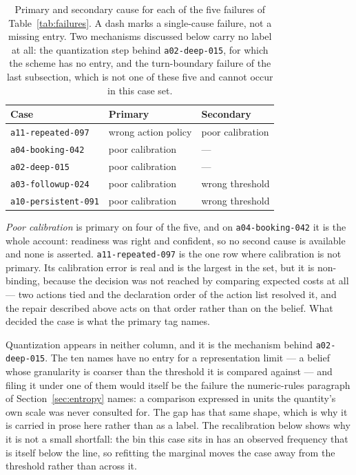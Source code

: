 \documentclass{article}
\begin{document}
\begin{table}[t]
\centering
\small
\begin{tabular}{lll}
\toprule
Case & Primary & Secondary \\
\midrule
\texttt{a11-repeated-097}   & wrong action policy & poor calibration \\
\texttt{a04-booking-042}    & poor calibration    & --- \\
\texttt{a02-deep-015}       & poor calibration    & --- \\
\texttt{a03-followup-024}   & poor calibration    & wrong threshold \\
\texttt{a10-persistent-091} & poor calibration    & wrong threshold \\
\bottomrule
\end{tabular}
\caption{Primary and secondary cause for each of the five failures of
Table~\ref{tab:failures}. A dash marks a single-cause failure, not a missing entry.
Two mechanisms discussed below carry no label at all: the quantization step behind
\texttt{a02-deep-015}, for which the scheme has no entry, and the turn-boundary
failure of the last subsection, which is not one of these five and cannot occur in
this case set.}
\label{tab:categories}
\end{table}

\emph{Poor calibration} is primary on four of the five, and on
\texttt{a04-booking-042} it is the whole account: readiness was right and
confident, so no second cause is available and none is asserted.
\texttt{a11-repeated-097} is the one row where calibration is not primary. Its
calibration error is real and is the largest in the set, but it is non-binding,
because the decision was not reached by comparing expected costs at all --- two
actions tied and the declaration order of the action list resolved it, and the
repair described above acts on that order rather than on the belief. What decided
the case is what the primary tag names.

Quantization appears in neither column, and it is the mechanism behind
\texttt{a02-deep-015}. The ten names have no entry for a representation limit ---
a belief whose granularity is coarser than the threshold it is compared against ---
and filing it under one of them would itself be the failure the numeric-rules
paragraph of Section~\ref{sec:entropy} names: a comparison expressed in units the
quantity's own scale was never consulted for. The gap has that same shape, which is
why it is carried in prose here rather than as a label. The recalibration below
shows why it is not a small shortfall: the bin this case sits in has an observed
frequency that is itself below the line, so refitting the marginal moves the case
away from the threshold rather than across it.
\end{document}
